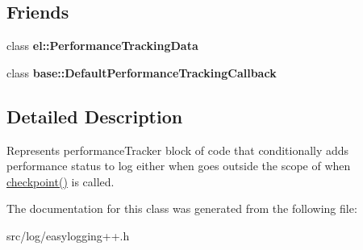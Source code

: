 \subsection*{Friends}
\begin{DoxyCompactItemize}
\item 
class {\bfseries el\+::\+Performance\+Tracking\+Data}\hypertarget{classel_1_1base_1_1PerformanceTracker_a7a4da7334b79856c37538484584207a6}{}\label{classel_1_1base_1_1PerformanceTracker_a7a4da7334b79856c37538484584207a6}

\item 
class {\bfseries base\+::\+Default\+Performance\+Tracking\+Callback}\hypertarget{classel_1_1base_1_1PerformanceTracker_ad346c4097e3db22a7434e7da5aa9c5e3}{}\label{classel_1_1base_1_1PerformanceTracker_ad346c4097e3db22a7434e7da5aa9c5e3}

\end{DoxyCompactItemize}


\subsection{Detailed Description}
Represents performance\+Tracker block of code that conditionally adds performance status to log either when goes outside the scope of when \hyperlink{classel_1_1base_1_1PerformanceTracker_aec9a6e149674c5782cc855e49aeb0aaf}{checkpoint()} is called. 

The documentation for this class was generated from the following file\+:\begin{DoxyCompactItemize}
\item 
src/log/easylogging++.\+h\end{DoxyCompactItemize}
